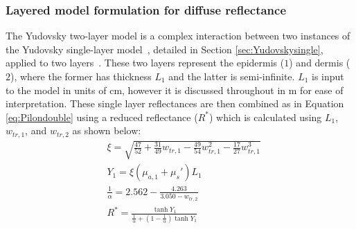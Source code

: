 \subsubsection{Layered model formulation for diffuse reflectance}\label{sec:Yudovsky2009}
% 
The Yudovsky two-layer model is a complex interaction between two instances of the Yudovsky single-layer model~\cite{Yudovsky2009}, detailed in Section \ref{sec:Yudovskysingle}, applied to two layers~\cite{Yudovsky2009}. 
These two layers represent the epidermis ($1$) and dermis ($2$), where the former has thickness $L_1$ and the latter is semi-infinite. $L_1$ is input to the model in units of cm, however it is discussed throughout in \textmu m for ease of interpretation.
These single layer reflectances are then combined as in Equation \eqref{eq:Pilondouble} using a reduced reflectance ($R^*$) which is calculated using $L_1$, $w_{tr, 1}$, and $w_{tr,2}$ as 
shown below:
\begin{equation}
\begin{aligned}
    & \xi = \sqrt{\frac{47}{52} + \frac{31}{49}w_{tr, 1} - \frac{49}{54}w_{tr, 1}^2 - \frac{17}{27}w_{tr, 1}^3} \\
    & Y_1 = \xi(\mu_{a,1} + \mu_s')L_1 \\
    & \frac{1}{\alpha} = 2.562 - \frac{4.263}{3.050 - w_{tr, 2}} \\
    & R^* = \frac{\tanh{Y_1}}{\frac{1}{\alpha} + (1 - \frac{1}{\alpha})\tanh{Y_1}} \\
\end{aligned}
\label{eq:reducedR}
\end{equation} 
